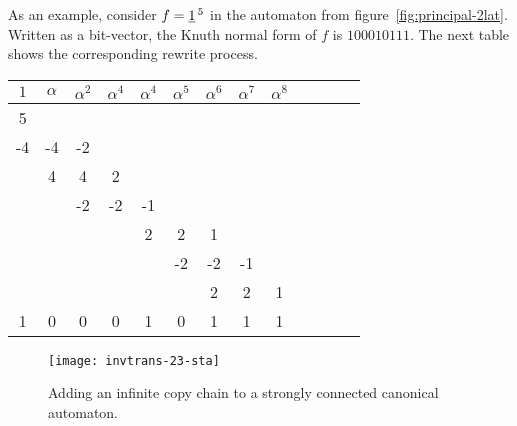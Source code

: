\documentclass[12pt]{svmult}
\def\F#1{\underline{\smash{#1}}\,}       %
\begin{document}
As an example, consider $f = \F{1}^{5}$ in the automaton from figure~\ref{fig:principal-2lat}.
Written as a bit-vector, the Knuth normal form of $f$ is $100010111$.
The next table shows the corresponding rewrite process. 

\hspace*{10mm}
\begin{tabular*}{0.65\linewidth}[h]{ccccccccccccc}
  \hspace{0.8mm} $1$ \hspace{0.8mm}  & \hspace{0.8mm} $\alpha$ \hspace{0.8mm}  & \hspace{0.8mm} $\alpha^2$  \hspace{0.8mm} %
& \hspace{0.8mm} $\alpha^4$  \hspace{0.8mm} &  \hspace{0.8mm} $\alpha^4$  \hspace{1ex} & \hspace{0.8mm} $\alpha^5$  \hspace{0.8mm} %
& \hspace{0.8mm} $\alpha^6$  \hspace{0.8mm} &  \hspace{0.8mm} $\alpha^7$  & \hspace{0.8mm} $\alpha^8$  \hspace{0.8mm}  \\
\hline 
  5 \\
  -4  &  -4  &  -2 \\
     &    4  &  4  &  2 \\
     &       &  -2  &  -2  &  -1 \\
     &   &    &   &  2  &  2  &  1 \\
     &   &    &  &  &  -2  &  -2  &  -1 \\
     &   &    &   &  &  &  2  &  2  &  1 \\
\hline
   1 &  0  &  0 & 0 & 1  & 0 &  1  &  1 & 1
\end{tabular*}

\begin{figure}[t]
  \centering
  \texttt{[image: invtrans-23-sta]}
  \caption{Adding an infinite copy chain to a strongly connected canonical automaton.}
  \label{fig:extension-A-3-2}
\end{figure}
\end{document}
